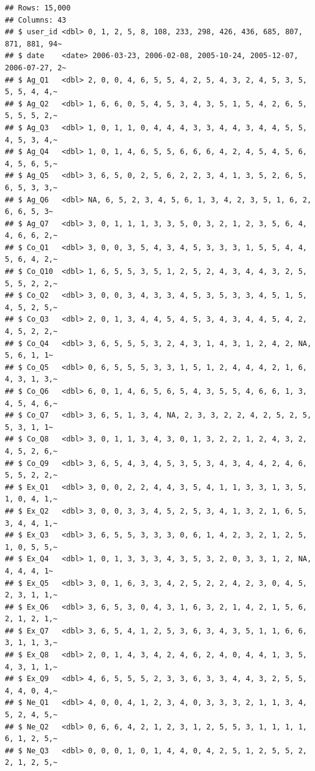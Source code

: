 \documentclass[
  oneside]{book}
\begin{document}
\begin{verbatim}
## Rows: 15,000
## Columns: 43
## $ user_id <dbl> 0, 1, 2, 5, 8, 108, 233, 298, 426, 436, 685, 807, 871, 881, 94~
## $ date    <date> 2006-03-23, 2006-02-08, 2005-10-24, 2005-12-07, 2006-07-27, 2~
## $ Ag_Q1   <dbl> 2, 0, 0, 4, 6, 5, 5, 4, 2, 5, 4, 3, 2, 4, 5, 3, 5, 5, 5, 4, 4,~
## $ Ag_Q2   <dbl> 1, 6, 6, 0, 5, 4, 5, 3, 4, 3, 5, 1, 5, 4, 2, 6, 5, 5, 5, 5, 2,~
## $ Ag_Q3   <dbl> 1, 0, 1, 1, 0, 4, 4, 4, 3, 3, 4, 4, 3, 4, 4, 5, 5, 4, 5, 3, 4,~
## $ Ag_Q4   <dbl> 1, 0, 1, 4, 6, 5, 5, 6, 6, 6, 4, 2, 4, 5, 4, 5, 6, 4, 5, 6, 5,~
## $ Ag_Q5   <dbl> 3, 6, 5, 0, 2, 5, 6, 2, 2, 3, 4, 1, 3, 5, 2, 6, 5, 6, 5, 3, 3,~
## $ Ag_Q6   <dbl> NA, 6, 5, 2, 3, 4, 5, 6, 1, 3, 4, 2, 3, 5, 1, 6, 2, 6, 6, 5, 3~
## $ Ag_Q7   <dbl> 3, 0, 1, 1, 1, 3, 3, 5, 0, 3, 2, 1, 2, 3, 5, 6, 4, 4, 6, 6, 2,~
## $ Co_Q1   <dbl> 3, 0, 0, 3, 5, 4, 3, 4, 5, 3, 3, 3, 1, 5, 5, 4, 4, 5, 6, 4, 2,~
## $ Co_Q10  <dbl> 1, 6, 5, 5, 3, 5, 1, 2, 5, 2, 4, 3, 4, 4, 3, 2, 5, 5, 5, 2, 2,~
## $ Co_Q2   <dbl> 3, 0, 0, 3, 4, 3, 3, 4, 5, 3, 5, 3, 3, 4, 5, 1, 5, 4, 5, 2, 5,~
## $ Co_Q3   <dbl> 2, 0, 1, 3, 4, 4, 5, 4, 5, 3, 4, 3, 4, 4, 5, 4, 2, 4, 5, 2, 2,~
## $ Co_Q4   <dbl> 3, 6, 5, 5, 5, 3, 2, 4, 3, 1, 4, 3, 1, 2, 4, 2, NA, 5, 6, 1, 1~
## $ Co_Q5   <dbl> 0, 6, 5, 5, 5, 3, 3, 1, 5, 1, 2, 4, 4, 4, 2, 1, 6, 4, 3, 1, 3,~
## $ Co_Q6   <dbl> 6, 0, 1, 4, 6, 5, 6, 5, 4, 3, 5, 5, 4, 6, 6, 1, 3, 4, 5, 4, 6,~
## $ Co_Q7   <dbl> 3, 6, 5, 1, 3, 4, NA, 2, 3, 3, 2, 2, 4, 2, 5, 2, 5, 5, 3, 1, 1~
## $ Co_Q8   <dbl> 3, 0, 1, 1, 3, 4, 3, 0, 1, 3, 2, 2, 1, 2, 4, 3, 2, 4, 5, 2, 6,~
## $ Co_Q9   <dbl> 3, 6, 5, 4, 3, 4, 5, 3, 5, 3, 4, 3, 4, 4, 2, 4, 6, 5, 5, 2, 2,~
## $ Ex_Q1   <dbl> 3, 0, 0, 2, 2, 4, 4, 3, 5, 4, 1, 1, 3, 3, 1, 3, 5, 1, 0, 4, 1,~
## $ Ex_Q2   <dbl> 3, 0, 0, 3, 3, 4, 5, 2, 5, 3, 4, 1, 3, 2, 1, 6, 5, 3, 4, 4, 1,~
## $ Ex_Q3   <dbl> 3, 6, 5, 5, 3, 3, 3, 0, 6, 1, 4, 2, 3, 2, 1, 2, 5, 1, 0, 5, 5,~
## $ Ex_Q4   <dbl> 1, 0, 1, 3, 3, 3, 4, 3, 5, 3, 2, 0, 3, 3, 1, 2, NA, 4, 4, 4, 1~
## $ Ex_Q5   <dbl> 3, 0, 1, 6, 3, 3, 4, 2, 5, 2, 2, 4, 2, 3, 0, 4, 5, 2, 3, 1, 1,~
## $ Ex_Q6   <dbl> 3, 6, 5, 3, 0, 4, 3, 1, 6, 3, 2, 1, 4, 2, 1, 5, 6, 2, 1, 2, 1,~
## $ Ex_Q7   <dbl> 3, 6, 5, 4, 1, 2, 5, 3, 6, 3, 4, 3, 5, 1, 1, 6, 6, 3, 1, 1, 3,~
## $ Ex_Q8   <dbl> 2, 0, 1, 4, 3, 4, 2, 4, 6, 2, 4, 0, 4, 4, 1, 3, 5, 4, 3, 1, 1,~
## $ Ex_Q9   <dbl> 4, 6, 5, 5, 5, 2, 3, 3, 6, 3, 3, 4, 4, 3, 2, 5, 5, 4, 4, 0, 4,~
## $ Ne_Q1   <dbl> 4, 0, 0, 4, 1, 2, 3, 4, 0, 3, 3, 3, 2, 1, 1, 3, 4, 5, 2, 4, 5,~
## $ Ne_Q2   <dbl> 0, 6, 6, 4, 2, 1, 2, 3, 1, 2, 5, 5, 3, 1, 1, 1, 1, 6, 1, 2, 5,~
## $ Ne_Q3   <dbl> 0, 0, 0, 1, 0, 1, 4, 4, 0, 4, 2, 5, 1, 2, 5, 5, 2, 2, 1, 2, 5,~

\end{verbatim}
\end{document}
